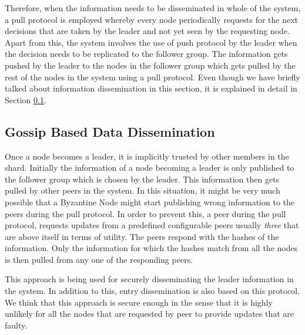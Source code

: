 \documentclass[a4paper,11pt]{kth-mag}
\begin{document}
Therefore, when the information needs to be disseminated in whole of the system, a pull protocol is employed whereby every node periodically requests for the next decisions that are taken by the leader and not yet seen by the requesting node. Apart from this, the system involves the use of push protocol by the leader when the decision needs to be replicated to the follower group. The information gets pushed by the leader to the nodes in the follower group which gets pulled by the rest of the nodes in the system using a pull protocol. Even though we have briefly talked about information dissemination in this section, it is explained in detail in Section \ref{ssec:gossip}.

\subsection{Gossip Based Data Dissemination}
\label{ssec:gossip}
Once a node becomes a leader, it is implicitly trusted by other members in the shard. Initially the information of a node becoming a leader is only published to the follower group which is chosen by the leader. This information then gets pulled by other peers in the system. In this situation, it might be very much possible that a Byzantine Node might start publishing wrong information to the peers during the pull protocol. In order to prevent this, a peer during the pull protocol, requests updates from a predefined configurable peers usually \textit{three} that are above itself in terms of utility.  The peers respond with the hashes of the information. Only the information for which the hashes match from all the nodes is then pulled from any one of the responding peers.
\par This approach is being used for securely disseminating the leader information in the system. In addition to this, entry dissemination is also based on this protocol. We think that this approach is secure enough in the sense that it is highly unlikely for all the nodes that are requested by peer to provide updates that are faulty.
\end{document}
